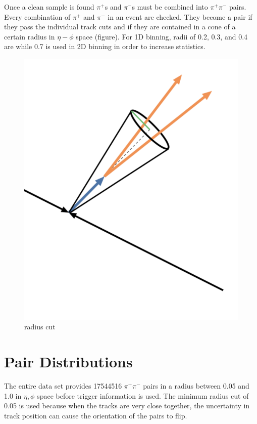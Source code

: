 \documentclass[abstract = on,listof=totoc, bibliography=totoc]{scrreprt}
\begin{document}
Once a clean sample is found $\pi^+$s and $\pi^-$s must be combined into $\pi^+\pi^-$ pairs. Every combination of $\pi^+$ and $\pi^-$ in an event are checked. They become a pair if they pass the individual track cuts and if they are contained in a cone of a certain radius in $\eta-\phi$ space (figure). For 1D binning, radii of 0.2, 0.3, and 0.4 are while 0.7 is used in 2D binning in order to increase statistics.  

\begin{figure}
\begin{center}
\includegraphics[width = 1\textwidth]{coneNew3}
\caption[Radius cut]{radius cut}
\label{fig:radCut}
\end{center}
\end{figure}

\FloatBarrier
\section{Pair Distributions}

The entire data set provides 17544516 $\pi^+\pi^-$ pairs in a radius between 0.05 and 1.0 in $\eta,\phi$ space before trigger information is used. The minimum radius cut of 0.05 is used because when the tracks are very close together, the uncertainty in track position can cause the orientation of the pairs to flip. 
\end{document}
